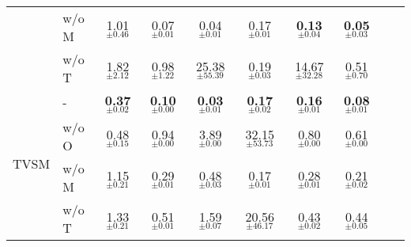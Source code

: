 \begin{table}[t]
\begin{center}
\begin{small}
\begin{sc}
\begin{tabular}{llcccccccc}
                             & w/o M & 1.01$_{\pm 0.46}$ & 0.07$_{\pm 0.01}$ & 0.04$_{\pm 0.01}$ & 0.17$_{\pm 0.01}$ & \textbf{0.13}$_{\pm \mathbf{0.04}}$ & \textbf{0.05}$_{\pm \mathbf{0.03}}$ & \\
                             & w/o T & 1.82$_{\pm 2.12}$ & 0.98$_{\pm 1.22}$ & 25.38$_{\pm 55.39}$ & 0.19$_{\pm 0.03}$ & 14.67$_{\pm 32.28}$ & 0.51$_{\pm 0.70}$ & \\
\midrule
\multirow{4}{*}{TVSM} & -     & \textbf{0.37}$_{\pm \mathbf{0.02}}$ & \textbf{0.10}$_{\pm \mathbf{0.00}}$ & \textbf{0.03}$_{\pm \mathbf{0.01}}$ & \textbf{0.17}$_{\pm \mathbf{0.02}}$ & \textbf{0.16}$_{\pm \mathbf{0.01}}$ & \textbf{0.08}$_{\pm \mathbf{0.01}}$ & \\
                             & w/o O & 0.48$_{\pm 0.15}$ & 0.94$_{\pm 0.00}$ & 3.89$_{\pm 0.00}$ & 32.15$_{\pm 53.73}$ & 0.80$_{\pm 0.00}$ & 0.61$_{\pm 0.00}$ & \\
                             & w/o M & 1.15$_{\pm 0.21}$ & 0.29$_{\pm 0.01}$ & 0.48$_{\pm 0.03}$ & 0.17$_{\pm 0.01}$ & 0.28$_{\pm 0.01}$ & 0.21$_{\pm 0.02}$ & \\
                             & w/o T & 1.33$_{\pm 0.21}$ & 0.51$_{\pm 0.01}$ & 1.59$_{\pm 0.07}$ & 20.56$_{\pm 46.17}$ & 0.43$_{\pm 0.02}$ & 0.44$_{\pm 0.05}$ & \\
\bottomrule
\end{tabular}
\end{sc}
\end{small}
\end{center}
\vskip -0.1in
\end{table}
